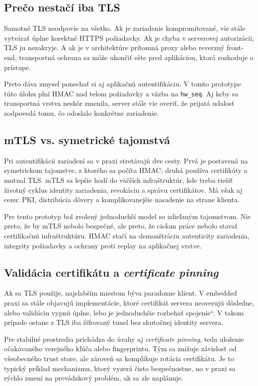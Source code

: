 \documentclass[journal,a4paper,onecolumn]{IEEEtran}
\newcommand{\uv}[1]{\quotedblbase#1\textquotedblleft}
\begin{document}
\subsection{Prečo nestačí iba TLS}

Samotné TLS neodpovie na všetko. Ak je zariadenie kompromitované, vie stále vytvárať úplne korektné HTTPS požiadavky. Ak je chyba v serverovej autorizácii, TLS ju nezakryje. A ak je v architektúre prítomná proxy alebo reverzný front-end, transportná ochrana sa môže ukončiť ešte pred aplikáciou, ktorá rozhoduje o prístupe.

Preto dáva zmysel ponechať si aj aplikačnú autentifikáciu. V tomto prototype túto úlohu plní HMAC nad telom požiadavky a väzba na \texttt{hw\_seq}. Aj keby sa transportná vrstva neskôr zmenila, server stále vie overiť, že prijatá udalosť zodpovedá tomu, čo odoslalo konkrétne zariadenie.

\subsection{mTLS vs. symetrické tajomstvá}

Pri autentifikácii zariadení sa v praxi stretávajú dve cesty. Prvá je postavená na symetrickom tajomstve, z ktorého sa počíta HMAC; druhá používa certifikáty a mutual TLS. mTLS sa lepšie hodí do väčších infraštruktúr, kde treba riešiť životný cyklus identity zariadenia, revokáciu a správu certifikátov. Má však aj cenu: PKI, distribúcia dôvery a komplikovanejšie nasadenie na strane klienta.

Pre tento prototyp bol zvolený jednoduchší model so zdieľaným tajomstvom. Nie preto, že by mTLS nebolo bezpečné, ale preto, že cieľom práce nebolo stavať certifikačnú infraštruktúru. HMAC stačí na demonštráciu autenticity zariadenia, integrity požiadavky a ochrany proti replay na aplikačnej vrstve.

\subsection{Validácia certifikátu a \emph{certificate pinning}}

Ak sa TLS použije, najslabším miestom býva paradoxne klient. V embedded praxi sa stále objavujú implementácie, ktoré certifikát servera neoverujú dôsledne, alebo validáciu vypnú úplne, lebo je \uv{jednoduchšie rozbehať spojenie}. V takom prípade ostane z TLS iba šifrovaný tunel bez skutočnej identity servera.

Pre stabilné prostredia prichádza do úvahy aj \emph{certificate pinning}, teda uloženie očakávaného verejného kľúča alebo fingerprintu. Tým sa znižuje závislosť od všeobecného trust store, ale zároveň sa komplikuje rotácia certifikátu. Je to typický príklad mechanizmu, ktorý vyzerá čisto bezpečnostne, no v praxi sa rýchlo zmení na prevádzkový problém, ak sa zle naplánuje.\cite{RFC9325}
\end{document}
